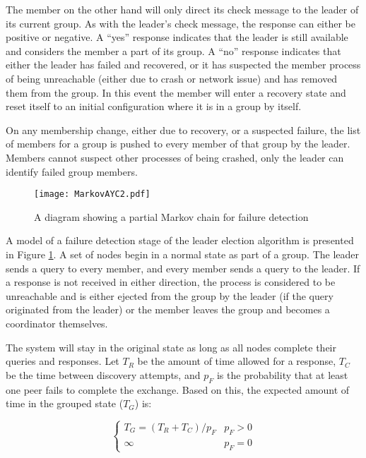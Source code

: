 The member on the other hand will only direct its check message to the leader
of its current group. As with the leader's check message, the response can
either be positive or negative. A ``yes'' response indicates that the leader is
still available and considers the member a part of its group. A ``no'' response
indicates that either the leader has failed and recovered, or it has suspected
the member process of being unreachable (either due to crash or network issue)
and has removed them from the group. In this event the member will enter a
recovery state and reset itself to an initial configuration where it is in a
group by itself.

On any membership change, either due to recovery, or a suspected failure, the
list of members for a group is pushed to every member of that group by the
leader. Members cannot suspect other processes of being crashed, only the
leader can identify failed group members.

\begin{figure}
\centering
\texttt{[image: MarkovAYC2.pdf]}
\caption{A diagram showing a partial Markov chain for failure detection}
\label{fig:MARKOVAYC}
\end{figure}

A model of a failure detection stage of the leader election algorithm is presented in
Figure \ref{fig:MARKOVAYC}. A set of nodes begin in a normal state as part of a group.
The leader sends a query to every member, and every member sends a query to the leader.
If a response is not received in either direction, the process is considered to be
unreachable and is either ejected from the group by the leader (if the query originated from the leader)
or the member leaves the group and becomes a coordinator themselves.

The system will stay in the original state as long as all nodes complete their queries and responses.
Let $T_{R}$ be the amount of time allowed for a response, $T_{C}$ be the time between
discovery attempts, and $p_{F}$ is the probability that at least one peer fails to complete the exchange.
Based on this, the expected amount of time in the grouped state ($T_{G}$) is:

\begin{equation}
\begin{cases}
T_{G} = ( T_{R}+T_{C}  ) / p_{F} & p_{F} > 0 \\
\infty & p_{F} = 0
\end{cases}
\end{equation}

